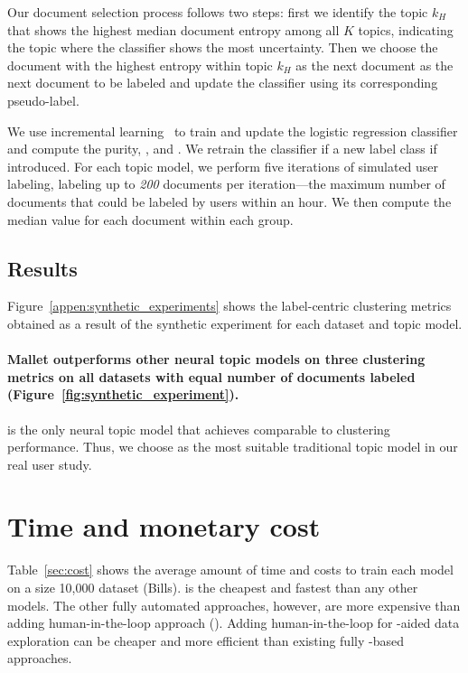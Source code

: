Our document selection process follows two steps: first we identify the topic \(k_H\) that shows the highest median document entropy among all \(K\) topics, indicating the topic where the classifier shows the most uncertainty. 
%
Then we choose the document with the highest entropy within topic \(k_H\) as the next document as the next document to be labeled and update the classifier using its corresponding pseudo-label.


%
We use incremental learning~\cite{incrementallearning} to train and update the logistic regression classifier and compute the purity, , and .
%
We retrain the classifier if a new label class if introduced.
%
For each topic model, we perform five iterations of simulated user labeling, labeling up to \textit{200} documents per iteration---the maximum number of documents that could be labeled by users within an hour. We then compute the median value for each document within each group.


\subsection{Results}
Figure~\ref{appen:synthetic_experiments} shows the label-centric clustering metrics obtained as a result of the synthetic experiment for each dataset and topic model.

\paragraph{Mallet  outperforms other neural topic models on three clustering metrics on all datasets with equal number of documents labeled (Figure~\ref{fig:synthetic_experiment}).}
%
 is the only neural topic model that achieves comparable to  clustering performance. Thus, we choose  as the most suitable traditional topic model in our real user study.



\section{Time and monetary cost}
\label{app:time_monetary_cost}
Table~\ref{sec:cost} shows the average amount of time and costs to train each model on a size 10,000 dataset (Bills). 
%
 is the cheapest and fastest than any other models.
%
The other fully automated \mm{} approaches, however, are more expensive than adding human-in-the-loop approach (\bass{}).
%
Adding human-in-the-loop for \mm{}-aided data exploration can be cheaper and more efficient than existing fully \mm{}-based approaches.

